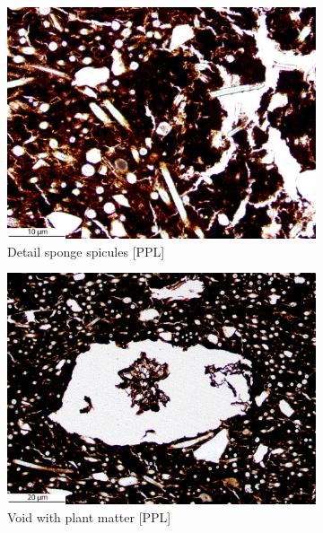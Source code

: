 \documentclass[a4paper]{article}
\begin{document}
\begin{figure}[H]
\begin{subfigure}[t]{.32\textwidth}
		\includegraphics[width=\textwidth]{ThinSections/104-1_20x_PPL.jpg}
		\caption{Detail sponge spicules [PPL]}
	\end{subfigure}\hspace{.1em}\hfill
	\begin{subfigure}[t]{.32\textwidth}
		\includegraphics[width=\textwidth]{ThinSections/104-2_10x_PPL.jpg}
		\caption{Void with plant matter [PPL]}
	\end{subfigure}\hspace{.1em}\hfill
	\begin{subfigure}[t]{.32\textwidth}

\end{subfigure}
\end{figure}
\end{document}
